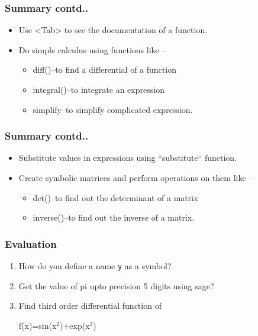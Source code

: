 \documentclass[17pt,compress]{beamer}
\begin{document}
\begin{frame}
\frametitle{Summary contd..}
\label{sec-14.2}

\begin{itemize}
\item Use <Tab> to see the documentation of a function.
\item Do simple calculus using functions like --
	\begin{itemize}
	\item diff()--to find a differential of a function
	\item integral()--to integrate an expression
	\item simplify--to simplify complicated expression.
	\end{itemize}
\end{itemize}
\end{frame}
\begin{frame}
\frametitle{Summary contd..}
\label{sec-14.3}

\begin{itemize}
\item Substitute values in expressions using ``substitute`` function.
\item Create symbolic matrices and perform operations on them like --
	\begin{itemize}
	\item det()--to find out the determinant of a matrix
	\item inverse()--to find out the inverse of a matrix.
	\end{itemize}
\end{itemize}
\end{frame}
\begin{frame}
\frametitle{Evaluation}
\label{sec-15}


\begin{enumerate}
\item How do you define a name \texttt{y} as a symbol?\pause
\vspace{8pt}
\item Get the value of pi upto precision 5 digits using sage?\pause
\vspace{8pt}
\item Find third order differential function of

   f(x)=sin(x$^2$)+exp(x$^3$)
\end{enumerate}
\end{frame}
\end{document}
